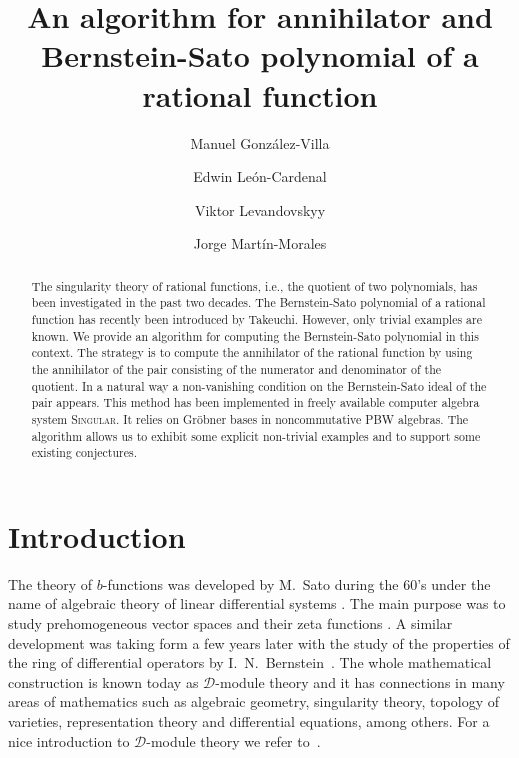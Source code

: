\documentclass[a4paper,12pt]{amsart}
\title[Annihilator and B-S polynomial of a rational function]
{An algorithm for annihilator and Bernstein-Sato polynomial of a rational function}
\author[M.~González-Villa]{Manuel González-Villa}
\author[E.~León-Cardenal]{Edwin León-Cardenal}
\author[V.~Levandovskyy]{Viktor Levandovskyy}
\author[J.~Martín-Morales]{Jorge Martín-Morales}
\theoremstyle{plain}
\theoremstyle{definition}
\theoremstyle{remark}
\begin{document}
\begin{abstract}
The singularity theory of rational functions, i.e., the quotient of two polynomials, has been investigated
in the past two decades. The Bernstein-Sato polynomial of a rational function has recently been introduced by Takeuchi. However, only trivial examples are known. We provide an algorithm for computing the Bernstein-Sato polynomial in this context. The strategy is to compute the annihilator of the rational function by using the annihilator of the pair consisting of the numerator and denominator of the quotient. In a natural way a non-vanishing condition
on the Bernstein-Sato ideal of the pair appears. This method has been implemented in freely available computer algebra system \textsc{Singular}. It relies on Gr\"obner bases in noncommutative PBW algebras. The algorithm allows us to exhibit some explicit non-trivial examples and to support some existing conjectures.
\end{abstract}

\maketitle

\section{Introduction}

The theory of $b$-functions was developed by M.~Sato during the 60's under the name of algebraic theory of linear differential systems \cite{Sat90}. The main purpose was to study prehomogeneous vector spaces and their zeta functions \cite{SaShi74,SKKO80}. A similar development was taking form a few years later with the study of the properties of the ring of differential operators by I.~N.~Bernstein~\cite{Ber71,Ber72}. The whole mathematical construction is known today as $\mathcal{D}$-module theory and it has connections in many areas of mathematics such as algebraic geometry, singularity theory, topology of varieties, representation theory and differential equations, among others. For a nice introduction to $\mathcal{D}$-module theory we refer to~\cite{Cou95}.
\end{document}
